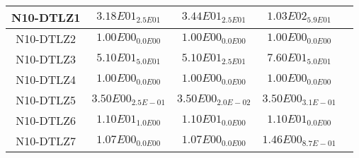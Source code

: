 \documentclass{article}
\begin{document}
\begin{table*}[ht!]
\begin{tabular}{|c||c||c||c||c|}
\hline
N10-DTLZ1 &\cellcolor{gray95}$3.18E01_{2.5E01}$ &\cellcolor{gray25}$3.44E01_{2.5E01}$ &$1.03E02_{5.9E01}$\\ 
\hline
N10-DTLZ2 &\cellcolor{gray95}$1.00E00_{0.0E00}$ &\cellcolor{gray25}$1.00E00_{0.0E00}$ &$1.00E00_{0.0E00}$\\ 
\hline
N10-DTLZ3 &\cellcolor{gray25}$5.10E01_{5.0E01}$ &\cellcolor{gray95}$5.10E01_{2.5E01}$ &$7.60E01_{5.0E01}$\\ 
\hline
N10-DTLZ4 &\cellcolor{gray95}$1.00E00_{0.0E00}$ &\cellcolor{gray25}$1.00E00_{0.0E00}$ &$1.00E00_{0.0E00}$\\ 
\hline
N10-DTLZ5 &\cellcolor{gray25}$3.50E00_{2.5E-01}$ &\cellcolor{gray95}$3.50E00_{2.0E-02}$ &$3.50E00_{3.1E-01}$\\ 
\hline
N10-DTLZ6 &$1.10E01_{1.0E00}$ &\cellcolor{gray95}$1.10E01_{0.0E00}$ &\cellcolor{gray25}$1.10E01_{0.0E00}$\\ 
\hline
N10-DTLZ7 &\cellcolor{gray95}$1.07E00_{0.0E00}$ &\cellcolor{gray25}$1.07E00_{0.0E00}$ &$1.46E00_{8.7E-01}$\\ 
\hline
\end{tabular}
\end{table*}
\end{document}
